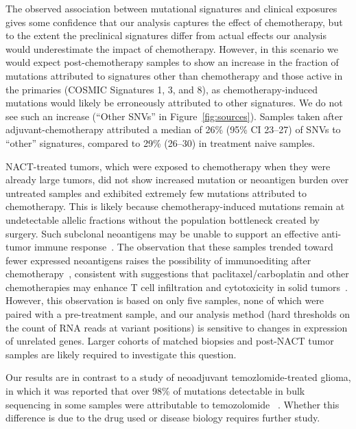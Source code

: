 The observed association between mutational signatures and clinical exposures gives some confidence that our analysis captures the effect of chemotherapy, but to the extent the preclinical signatures differ from actual effects our analysis would underestimate the impact of chemotherapy. However, in this scenario we would expect post-chemotherapy samples to show an increase in the fraction of mutations attributed to signatures other than chemotherapy and those active in the primaries (COSMIC Signatures 1, 3, and 8), as chemotherapy-induced mutations would likely be erroneously attributed to other signatures. We do not see such an increase (``Other SNVs'' in Figure~\ref{fig:sources}). Samples taken after adjuvant-chemotherapy attributed a median of 26\% (95\% CI 23--27) of SNVs to ``other'' signatures, compared to 29\% (26--30) in treatment naive samples.

NACT-treated tumors, which were exposed to chemotherapy when they were already large tumors, did not show increased mutation or neoantigen burden over untreated samples and exhibited extremely few mutations attributed to chemotherapy. This is likely because chemotherapy-induced mutations remain at undetectable allelic fractions without the population bottleneck created by surgery. Such subclonal neoantigens may be unable to support an effective anti-tumor immune response~\cite{McGranahan_2016}. The observation that these samples trended toward fewer expressed neoantigens raises the possibility of immunoediting after chemotherapy~\cite{Dunn_2002}, consistent with suggestions that paclitaxel/carboplatin and other chemotherapies may enhance T cell infiltration and cytotoxicity in solid tumors~\cite{Demaria2001,Wu_2009,Pfannenstiel_2010,Hodge_2013}. However, this observation is based on only five samples, none of which were paired with a pre-treatment sample, and our analysis method (hard thresholds on the count of RNA reads at variant positions) is sensitive to changes in expression of unrelated genes. Larger cohorts of matched biopsies and post-NACT tumor samples are likely required to investigate this question.

Our results are in contrast to a study of neoadjuvant temozlomide-treated glioma, in which it was reported that over 98\% of mutations detectable in bulk sequencing in some samples were attributable to temozolomide ~\cite{Johnson_2013}. Whether this difference is due to the drug used or disease biology requires further study.


